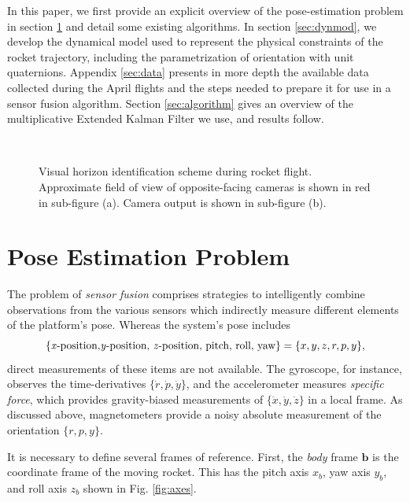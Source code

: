 \documentclass{article}
\begin{document}
In this paper, we first provide an explicit overview of the pose-estimation problem in section \ref{sec:posest} and detail some existing algorithms. In section \ref{sec:dynmod}, we develop the dynamical model used to represent the physical constraints of the rocket trajectory, including the parametrization of orientation with unit quaternions. Appendix \ref{sec:data} presents in more depth the available data collected during the April flights and the steps needed to prepare it for use in a sensor fusion algorithm. Section \ref{sec:algorithm} gives an overview of the multiplicative Extended Kalman Filter we use, and results follow.

\begin{figure}[ht]%
 \centering
 \\
 \caption{Visual horizon identification scheme during rocket flight. Approximate field of view of opposite-facing cameras is shown in red in sub-figure (a). Camera output is shown in sub-figure (b).}%
 \label{fig:horizon_overview}%
\end{figure}

\section{Pose Estimation Problem} \label{sec:posest}
The problem of \textit{sensor fusion} comprises strategies to intelligently combine observations from the various sensors which indirectly measure different elements of the platform's pose. Whereas the system's pose includes
\[
\{\text{\textit{x}-position,\textit{y}-position, \textit{z}-position, pitch, roll, yaw}\}
= \{x, y, z, r, p, y\},
\]
direct measurements of these items are not available. The gyroscope, for instance, observes the time-derivatives $\{\dot{r}, \dot{p}, \dot{y}\}$, and the accelerometer measures \textit{specific force}, which provides gravity-biased measurements of $\{\ddot{x}, \ddot{y}, \ddot{z} \}$ in a local frame. As discussed above, magnetometers provide a noisy absolute measurement of the orientation $\{r, p, y\}$. 

It is necessary to define several frames of reference. First, the \textit{body} frame $\textbf{b}$ is the coordinate frame of the moving rocket. This has the pitch axis $x_b$, yaw axis $y_b$, and roll axis $z_b$ shown in Fig. \ref{fig:axes}. 
\end{document}

